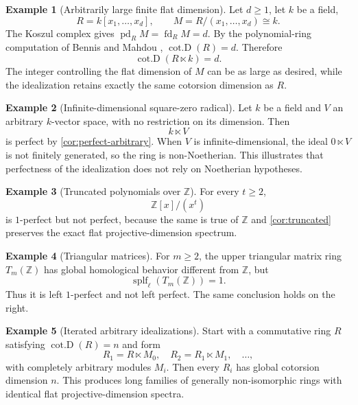 \documentclass[11pt,reqno]{amsart}
\newcommand{\pd}{\operatorname{pd}}
\newcommand{\fd}{\operatorname{fd}}
\newcommand{\cotD}{\operatorname{cot.D}}
\newcommand{\splf}{\operatorname{splf}}
\theoremstyle{plain}
\theoremstyle{definition}
\newtheorem{example}[example]{Example}
\theoremstyle{remark}
\begin{document}
\begin{example}[Arbitrarily large finite flat dimension]\label{ex:poly}
Let $d\ge1$, let $k$ be a field,
\[
  R=k[x_1,\dots,x_d],
  \qquad
  M=R/(x_1,\dots,x_d)\cong k.
\]
The Koszul complex gives $\pd_RM=\fd_RM=d$.  By the polynomial-ring computation
of Bennis and Mahdou \cite[Theorem~3.1]{BennisMahdou2009},
$\cotD(R)=d$.  Therefore
\[
  \cotD(R\ltimes k)=d.
\]
The integer controlling the flat dimension of $M$ can be as large as desired,
while the idealization retains exactly the same cotorsion dimension as $R$.
\end{example}

\begin{example}[Infinite-dimensional square-zero radical]\label{ex:field}
Let $k$ be a field and $V$ an arbitrary $k$-vector space, with no restriction on
its dimension.  Then
\[
  k\ltimes V
\]
is perfect by \cref{cor:perfect-arbitrary}.  When $V$ is infinite-dimensional, the ideal $0\ltimes V$ is not finitely generated, so the ring is non-Noetherian.  This illustrates that perfectness of the
idealization does not rely on Noetherian hypotheses.
\end{example}

\begin{example}[Truncated polynomials over $\mathbb Z$]\label{ex:truncZ}
For every $t\ge2$,
\[
  \mathbb Z[x]/(x^t)
\]
is $1$-perfect but not perfect, because the same is true of $\mathbb Z$ and
\cref{cor:truncated} preserves the exact flat projective-dimension spectrum.
\end{example}

\begin{example}[Triangular matrices]\label{ex:triZ}
For $m\ge2$, the upper triangular matrix ring $T_m(\mathbb Z)$ has global
homological behavior different from $\mathbb Z$, but
\[
  \splf_{\ell}(T_m(\mathbb Z))=1.
\]
Thus it is left $1$-perfect and not left perfect.  The same conclusion holds on the
right.
\end{example}

\begin{example}[Iterated arbitrary idealizations]\label{ex:iter}
Start with a commutative ring $R$ satisfying $\cotD(R)=n$ and form
\[
  R_1=R\ltimes M_0,
  \quad
  R_2=R_1\ltimes M_1,
  \quad\dots,
\]
with completely arbitrary modules $M_i$.  Then every $R_i$ has global cotorsion
dimension $n$.  This produces long families of generally non-isomorphic rings with
identical flat projective-dimension spectra.
\end{example}
\end{document}
